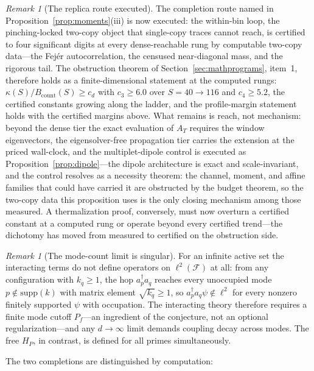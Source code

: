 \documentclass[11pt,a4paper]{article}
\theoremstyle{plain}
\theoremstyle{definition}
\theoremstyle{remark}
\newtheorem{remark}[theorem]{Remark}
\begin{document}
\begin{remark}[The replica route executed]\label{rem:replica}
The completion route named in Proposition~\ref{prop:moments}(iii) is now
executed: the within-bin loop, the pinching-locked two-copy object that
single-copy traces cannot reach, is certified to four significant digits
at every dense-reachable rung by computable two-copy data---the Fej\'er
autocorrelation, the censused near-diagonal mass, and the rigorous
tail.  The obstruction theorem of Section~\ref{sec:mathprograms}, item~1,
therefore holds as a finite-dimensional statement at the computed rungs:
$\kappa(S)/B_{\mathrm{count}}(S)\ge c_{d}$ with $c_{3}\ge6.0$ over
$S=40\to116$ and $c_{4}\ge5.2$, the certified constants growing along the
ladder, and the profile-margin statement holds with the certified
margins above.  What remains is reach, not mechanism: beyond the dense
tier the exact evaluation of $A_T$ requires the window eigenvectors, the
eigensolver-free propagation tier carries the extension at the priced
wall-clock, and the multiplet-dipole control is executed as
Proposition~\ref{prop:dipole}---the dipole architecture is exact and
scale-invariant, and the control resolves as a necessity theorem: the
channel, moment, and affine families that could have carried it are
obstructed by the budget theorem, so the two-copy data this proposition uses
is the only closing mechanism among those measured. A
thermalization proof, conversely, must now overturn a certified constant
at a computed rung or operate beyond every certified trend---the
dichotomy has moved from measured to certified on the obstruction side.
\end{remark}

\begin{remark}[The mode-count limit is singular]\label{rem:modecount}
For an infinite active set the interacting terms do not define operators on
$\ell^{2}(\mathcal{F})$ at all: from any configuration with $k_{q}\geq1$, the hop
$a_{p}^{\dagger}a_{q}$ reaches every unoccupied mode $p\notin\mathrm{supp}(k)$ with matrix
element $\sqrt{k_{q}}\geq1$, so $a_{p}^{\dagger}a_{q}\psi\notin\ell^{2}$ for every nonzero
finitely supported $\psi$ with occupation. The interacting theory therefore requires a
finite mode cutoff $P_{f}$---an ingredient of the conjecture, not an optional
regularization---and any $d\to\infty$ limit demands coupling decay across modes. The free
$H_{P}$, in contrast, is defined for all primes simultaneously.
\end{remark}

The two completions are distinguished by computation:
\end{document}
